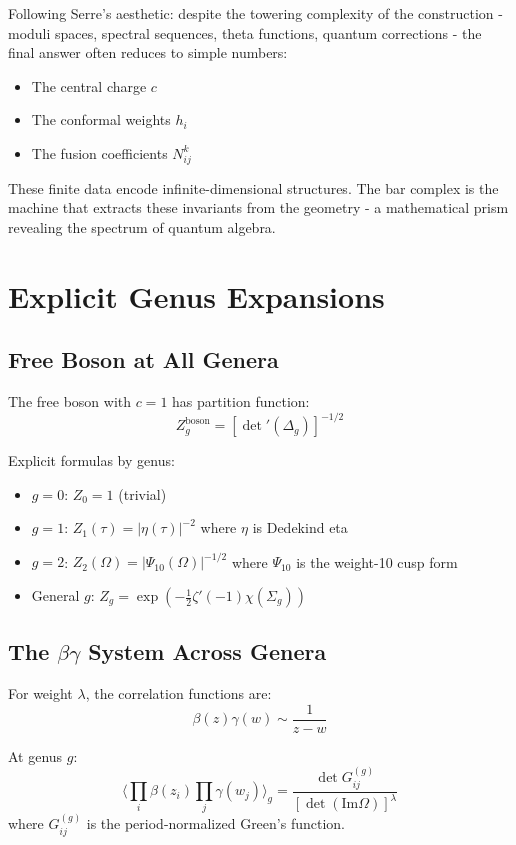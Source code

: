 \begin{remark}
Following Serre's aesthetic: despite the towering complexity of the construction - moduli spaces, spectral sequences, theta functions, quantum corrections - the final answer often reduces to simple numbers:
\begin{itemize}
\item The central charge $c$
\item The conformal weights $h_i$  
\item The fusion coefficients $N_{ij}^k$
\end{itemize}
These finite data encode infinite-dimensional structures. The bar complex is the machine that extracts these invariants from the geometry - a mathematical prism revealing the spectrum of quantum algebra.
\end{remark}

\chapter{Explicit Genus Expansions}

\section{Free Boson at All Genera}

The free boson with $c=1$ has partition function:
$$Z_g^{\text{boson}} = \left[\det'(\Delta_g)\right]^{-1/2}$$

Explicit formulas by genus:
\begin{itemize}
\item $g=0$: $Z_0 = 1$ (trivial)
\item $g=1$: $Z_1(\tau) = |\eta(\tau)|^{-2}$ where $\eta$ is Dedekind eta
\item $g=2$: $Z_2(\Omega) = |\Psi_{10}(\Omega)|^{-1/2}$ where $\Psi_{10}$ is the weight-10 cusp form
\item General $g$: $Z_g = \exp\left(-\frac{1}{2}\zeta'(-1) \chi(\Sigma_g)\right)$
\end{itemize}

\section{The $\beta\gamma$ System Across Genera}

For weight $\lambda$, the correlation functions are:
$$\beta(z)\gamma(w) \sim \frac{1}{z-w}$$

At genus $g$:
$$\langle \prod_i \beta(z_i) \prod_j \gamma(w_j) \rangle_g = \frac{\det G_{ij}^{(g)}}{\left[\det(\text{Im}\Omega)\right]^{\lambda}}$$
where $G_{ij}^{(g)}$ is the period-normalized Green's function.

